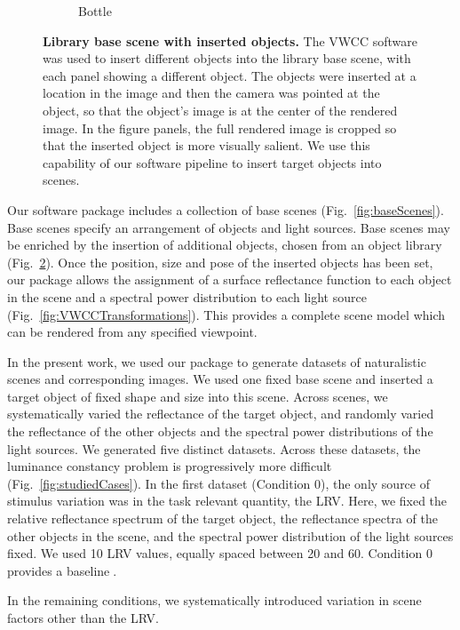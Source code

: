 \documentclass{jov}
\begin{document}
\begin{figure}
\begin{subfigure}[b]{0.14 \textwidth}
        \caption{Bottle}
        \label{fig:libraryWithChampagneBottle}
    \end{subfigure}
\caption{{\bf Library base scene with inserted objects.} The VWCC software was used to insert different objects into the library base scene, with each panel showing a different object. The objects were inserted at a location in the image and then the camera was pointed at the object, so that the object's image is at the center of the rendered image.  In the figure panels, the full rendered image is cropped so that the inserted object is more visually salient. We use this capability of our software pipeline to insert target objects into scenes.}\label{fig:libraryWithTarget}
\end{figure}

Our software package includes a collection of base scenes (Fig.~\ref{fig:baseScenes}).
Base scenes specify an arrangement of objects and light sources.
Base scenes may be enriched by the insertion of additional objects, chosen from an object library (Fig.~\ref{fig:libraryWithTarget}).
Once the position, size and pose of the inserted objects has been set, our package allows the assignment of a surface reflectance function to each object in the scene and a spectral power distribution to each light source (Fig.~\ref{fig:VWCCTransformations}).
This provides a complete scene model which can be rendered from any specified viewpoint.

In the present work, we used our package to generate datasets of naturalistic scenes and corresponding images.
We used one fixed base scene and inserted a target object of fixed shape and size into this scene.
Across scenes, we systematically varied the reflectance of the target object, and randomly varied the reflectance of the other objects and the spectral power distributions of the light sources.
We generated five distinct datasets.
Across these datasets, the luminance constancy problem is progressively more difficult (Fig.~\ref{fig:studiedCases}).
In the first dataset (Condition 0), the only source of stimulus variation was in the task relevant quantity, the LRV.
Here, we fixed the relative reflectance spectrum of the target object, the reflectance spectra of the other objects in the scene, and the spectral power distribution of the light sources fixed.
We used 10 LRV values, equally spaced between 20 and 60.
Condition 0 provides a baseline. 

In the remaining conditions, we systematically introduced variation in scene factors other than the LRV.
\end{document}

